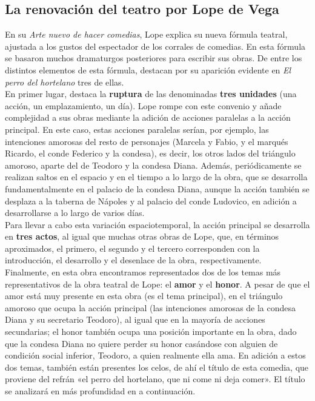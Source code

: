\documentclass[12pt,a4paper]{article}
\begin{document}
\subsection{La renovación del teatro por Lope de Vega}

En su \textit{Arte nuevo de hacer comedias}, Lope explica su nueva fórmula teatral, ajustada a los gustos del espectador de los corrales de comedias. En esta fórmula se basaron muchos dramaturgos posteriores para escribir sus obras. De entre los distintos elementos de esta fórmula, destacan por su aparición evidente en \textit{El perro del hortelano} tres de ellas.\\

En primer lugar, destaca la \textbf{ruptura} de las denominadas \textbf{tres unidades} (una acción, un emplazamiento, un día). Lope rompe con este convenio y añade complejidad a sus obras mediante la adición de acciones paralelas a la acción principal. En este caso, estas acciones paralelas serían, por ejemplo, las intenciones amorosas del resto de personajes (Marcela y Fabio, y el marqués Ricardo, el conde Federico y la condesa), es decir, los otros lados del triángulo amoroso, aparte del de Teodoro y la condesa Diana. Además, periódicamente se realizan saltos en el espacio y en el tiempo a lo largo de la obra, que se desarrolla fundamentalmente en el palacio de la condesa Diana, aunque la acción también se desplaza a la taberna de Nápoles y al palacio del conde Ludovico, en adición a desarrollarse a lo largo de varios días.\\

Para llevar a cabo esta variación espaciotemporal, la acción principal se desarrolla en \textbf{tres actos}, al igual que muchas otras obras de Lope, que, en términos aproximados, el primero, el segundo y el tercero corresponden con la introducción, el desarrollo y el desenlace de la obra, respectivamente.\\

Finalmente, en esta obra encontramos representados dos de los temas más representativos de la obra teatral de Lope: el \textbf{amor} y el \textbf{honor}. A pesar de que el amor está muy presente en esta obra (es el tema principal), en el triángulo amoroso que ocupa la acción principal (las intenciones amorosas de la condesa Diana y su secretario Teodoro), al igual que en la mayoría de acciones secundarias; el honor también ocupa una posición importante en la obra, dado que la condesa Diana no quiere perder su honor casándose con alguien de condición social inferior, Teodoro, a quien realmente ella ama. En adición a estos dos temas, también están presentes los celos, de ahí el título de esta comedia, que proviene del refrán «el perro del hortelano, que ni come ni deja comer». El título se analizará en más profundidad en a continuación.
\end{document}
